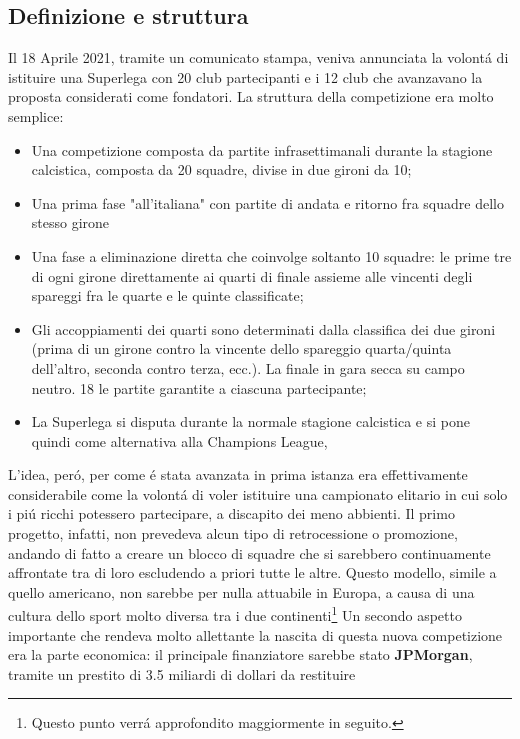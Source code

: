 \documentclass[
    corpo=12pt,
    oneside,
    evenboxes,
    tipotesi=triennale,
    stile=classica,
    oldstyle,
    autoretitolo,
    greek,
]{toptesi}
\begin{document}
\begin{interlinea}{1.5}
\section{Definizione e struttura}
Il 18 Aprile 2021, tramite un comunicato stampa, veniva annunciata la volont\'a di istituire una Superlega con 20 club partecipanti e i 12 club
che avanzavano la proposta considerati come fondatori. La struttura della competizione era molto semplice: 
\begin{itemize}
    \item Una competizione composta da partite infrasettimanali durante la stagione calcistica, composta da 20 squadre, divise in due gironi da 10;
    \item Una prima fase "all’italiana" con partite di andata e ritorno fra squadre dello stesso girone
    \item Una fase a eliminazione diretta che coinvolge soltanto 10 squadre: le prime tre di ogni 
    girone direttamente ai quarti di finale assieme alle vincenti degli spareggi fra le quarte e le quinte classificate;
    \item Gli accoppiamenti dei quarti sono determinati dalla classifica dei due gironi (prima di un girone contro la vincente 
    dello spareggio quarta/quinta dell’altro, seconda contro terza, ecc.). La finale in gara secca su campo neutro. 
    18 le partite garantite a ciascuna partecipante;
    \item La Superlega si disputa durante la normale stagione calcistica e si pone quindi come alternativa alla Champions League, 
\end{itemize}
L'idea, per\'o, per come \'e stata avanzata in prima istanza era effettivamente \linebreak considerabile come la volont\'a di voler istituire 
una campionato elitario in cui solo i pi\'u ricchi potessero partecipare, a discapito dei meno abbienti. Il primo progetto, infatti, non prevedeva
alcun tipo di retrocessione o promozione, andando di fatto a creare un blocco di squadre che si sarebbero continuamente affrontate tra di loro
escludendo a priori tutte le altre. Questo modello, simile a quello americano, non sarebbe per nulla attuabile in Europa, a causa di una cultura dello sport molto diversa tra i due continenti\footnote{Questo punto verr\'a approfondito maggiormente in seguito.}\newline
Un secondo aspetto importante che rendeva molto allettante la nascita di questa nuova competizione
era la parte economica: il principale finanziatore sarebbe stato \textbf{JPMorgan}, tramite un prestito di 3.5 miliardi di dollari da restituire

\end{interlinea}
\end{document}
